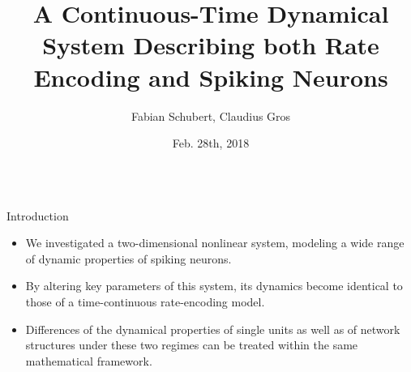 \documentclass{beamer}
\title{A Continuous-Time Dynamical System Describing both Rate Encoding and Spiking Neurons}
\author{Fabian Schubert, Claudius Gros}
\institute{Institute for Theoretical Physics, Goethe University Frankfurt a.M.}
\date[Feb. 28th, 2018]{Feb. 28th, 2018}
\begin{document}
\begin{frame}[t]
\begin{columns}[t]
\begin{column}{.45\textwidth}

\begin{myblock}{Introduction}
\begin{itemize}
\item We investigated a two-dimensional nonlinear system, modeling a wide range of dynamic 
properties of spiking neurons.
\item By altering key parameters of this system, its dynamics become identical to those of a 
time-continuous rate-encoding model.
\item Differences of the dynamical properties of single units as well as of network structures under 
these two regimes can be treated within the same mathematical framework.
\end{itemize}
\end{myblock}


\end{column}
\end{columns}
\end{frame}
\end{document}
